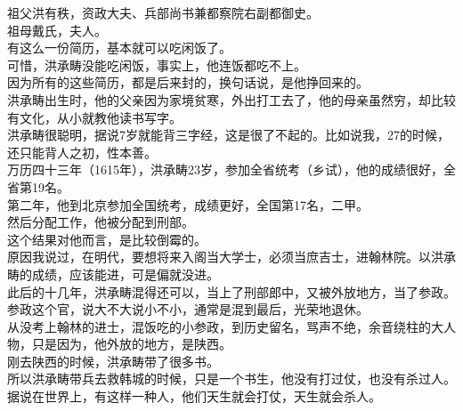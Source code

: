 \begin{multicols}{\theparacolNo}
祖父洪有秩，资政大夫、兵部尚书兼都察院右副都御史。\\

祖母戴氏，夫人。\\

有这么一份简历，基本就可以吃闲饭了。\\

可惜，洪承畴没能吃闲饭，事实上，他连饭都吃不上。\\

因为所有的这些简历，都是后来封的，换句话说，是他挣回来的。\\

洪承畴出生时，他的父亲因为家境贫寒，外出打工去了，他的母亲虽然穷，却比较有文化，从小就教他读书写字。\\

洪承畴很聪明，据说7岁就能背三字经，这是很了不起的。比如说我，27的时候，还只能背人之初，性本善。\\

万历四十三年（1615年），洪承畴23岁，参加全省统考（乡试），他的成绩很好，全省第19名。\\

第二年，他到北京参加全国统考，成绩更好，全国第17名，二甲。\\

然后分配工作，他被分配到刑部。\\

这个结果对他而言，是比较倒霉的。\\

原因我说过，在明代，要想将来入阁当大学士，必须当庶吉士，进翰林院。以洪承畴的成绩，应该能进，可是偏就没进。\\

此后的十几年，洪承畴混得还可以，当上了刑部郎中，又被外放地方，当了参政。\\

参政这个官，说大不大说小不小，通常是混到最后，光荣地退休。\\

从没考上翰林的进士，混饭吃的小参政，到历史留名，骂声不绝，余音绕柱的大人物，只是因为，他外放的地方，是陕西。\\

刚去陕西的时候，洪承畴带了很多书。\\

所以洪承畴带兵去救韩城的时候，只是一个书生，他没有打过仗，也没有杀过人。\\

据说在世界上，有这样一种人，他们天生就会打仗，天生就会杀人。\\


\end{multicols}
